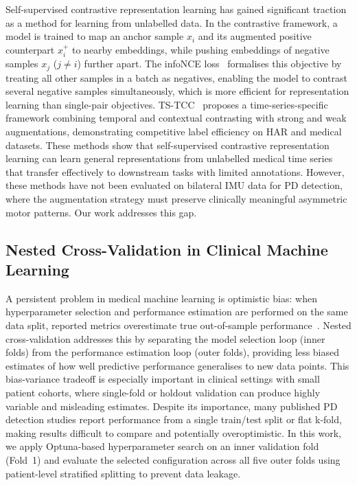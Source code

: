\documentclass[pmlr]{jmlr}
\begin{document}
Self-supervised contrastive representation learning has gained
significant traction as a method for learning from unlabelled data.
In the contrastive framework, a model is trained to map an anchor
sample $x_i$ and its augmented positive counterpart $x_i^+$ to nearby
embeddings, while pushing embeddings of negative samples $x_j$
($j \neq i$) further apart. The infoNCE loss~\citep{ref} formalises
this objective by treating all other samples in a batch as negatives,
enabling the model to contrast several negative samples simultaneously,
which is more efficient for representation learning than single-pair
objectives. TS-TCC~\citep{ref} proposes a time-series-specific
framework combining temporal and contextual contrasting with strong
and weak augmentations, demonstrating competitive label efficiency on
HAR and medical datasets. These methods show that self-supervised
contrastive representation learning can learn general representations
from unlabelled medical time series that transfer effectively to
downstream tasks with limited annotations. However, these methods have
not been evaluated on bilateral IMU data for PD detection, where the
augmentation strategy must preserve clinically meaningful asymmetric
motor patterns. Our work addresses this gap.

\subsection{Nested Cross-Validation in Clinical Machine Learning}

A persistent problem in medical machine learning is optimistic bias:
when hyperparameter selection and performance estimation are performed
on the same data split, reported metrics overestimate true
out-of-sample performance~\citep{ref}. Nested cross-validation
addresses this by separating the model selection loop (inner folds)
from the performance estimation loop (outer folds), providing less
biased estimates of how well predictive performance generalises to new
data points. This bias-variance tradeoff is especially important in
clinical settings with small patient cohorts, where single-fold or
holdout validation can produce highly variable and misleading
estimates. Despite its importance, many published PD detection studies
report performance from a single train/test split or flat k-fold,
making results difficult to compare and potentially overoptimistic.
In this work, we apply Optuna-based hyperparameter search on an inner
validation fold (Fold~1) and evaluate the selected configuration
across all five outer folds using patient-level stratified splitting
to prevent data leakage.
\end{document}
